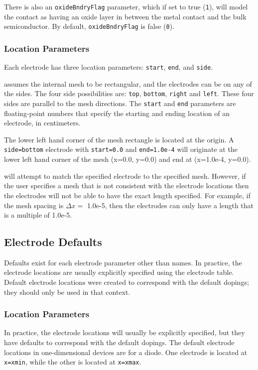
There is also an \texttt{oxideBndryFlag} parameter, which if set to true
(\texttt{1}), will model the contact as having an oxide layer in between
the metal contact and the bulk semiconductor.  By default,
\texttt{oxideBndryFlag} is false (\texttt{0}).  

\subsubsection{Location Parameters}
Each electrode has three location parameters: \texttt{start}, 
\texttt{end}, and \texttt{side}.  

\Xyce{} assumes the internal mesh to be rectangular, 
and the electrodes can be on any of the sides.  The four side possibilities
are: \texttt{top}, \texttt{bottom}, \texttt{right} and \texttt{left}.
These four sides are parallel to the mesh directions.  The \texttt{start} and
\texttt{end} parameters are floating-point numbers that specify the
starting and ending location of an electrode, in centimeters.

The lower left hand corner of the mesh rectangle is located 
at the origin.  A \texttt{side=bottom} electrode with \texttt{start=0.0} 
and \texttt{end=1.0e-4} will originate at the lower left hand 
corner of the mesh (x=0.0, y=0.0) and end at (x=1.0e-4, y=0.0).

\Xyce{} will attempt to match the specified electrode to
the specified mesh.  However, if the user specifies a mesh that is not
consistent with the electrode locations then the electrodes will not be 
able to have the exact length specified.  For example, if the mesh spacing
is $\Delta x = $ 1.0e-5, then the electrodes can only have a length
that is a multiple of 1.0e-5.

\subsection{Electrode Defaults}
Defaults exist for each electrode parameter other than names.
In practice, the electrode locations  are usually explicitly
specified  using the electrode table.
Default electrode locations were created to correspond with 
the default dopings; they should only be used in that context.

\subsubsection{Location Parameters}
In practice, the electrode locations will usually be explicitly
specified, but they have defaults to correspond with the default dopings.
The default electrode locations in one-dimensional devices are for a 
diode.  One electrode is located at \texttt{x=xmin}, while the other 
is located at \texttt{x=xmax}.

